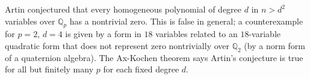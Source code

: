 Artin conjectured that every homogeneous polynomial of degree $d$ in $n > d^2$ variables over $\mathbb{Q}_p$ has a nontrivial zero. This is false in general; a counterexample for $p = 2$, $d = 4$ is given by a form in $18$ variables related to an $18$-variable quadratic form that does not represent zero nontrivially over $\mathbb{Q}_2$ (by a norm form of a quaternion algebra). The Ax-Kochen theorem says Artin's conjecture is true for all but finitely many $p$ for each fixed degree $d$.
